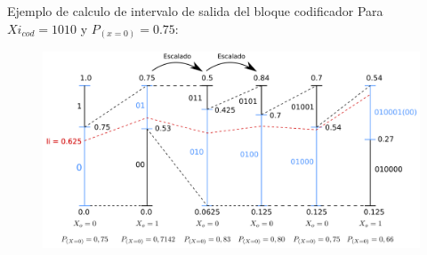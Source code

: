 \documentclass[xcolor=table]{beamer}
\begin{document}

\begin{frame}{Ejemplo de calculo de intervalo de salida del bloque codificador}
Para $Xi_{cod} = 1010$ y  $P_{(x=0)}=0.75$:
    \begin{figure}[H]
  \centering
  \includegraphics[width=0.85\paperwidth]{Diagramas/int_sal_cod.png}%
   \end{figure}
\end{frame}
\end{document}
